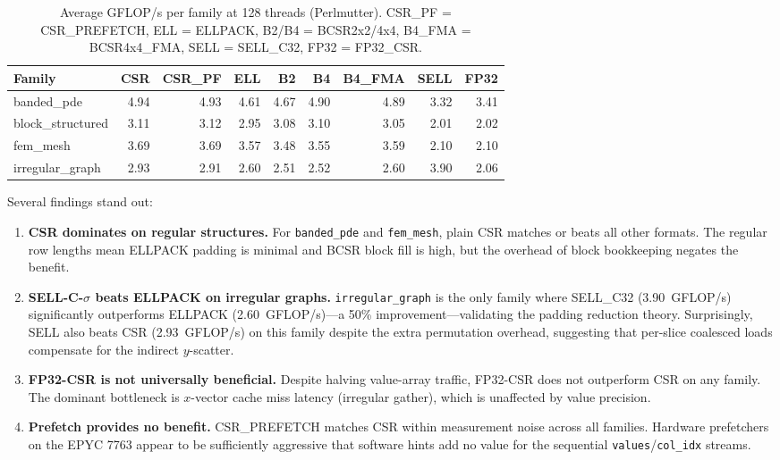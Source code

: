 \documentclass[11pt]{article}
\begin{document}
\begin{table}[h]
\centering
\small
\begin{tabular}{lrrrrrrrr}
\toprule
Family & CSR & CSR\_PF & ELL & B2 & B4 & B4\_FMA & SELL & FP32 \\
\midrule
banded\_pde      & 4.94 & 4.93 & 4.61 & 4.67 & 4.90 & 4.89 & 3.32 & 3.41 \\
block\_structured & 3.11 & 3.12 & 2.95 & 3.08 & 3.10 & 3.05 & 2.01 & 2.02 \\
fem\_mesh        & 3.69 & 3.69 & 3.57 & 3.48 & 3.55 & 3.59 & 2.10 & 2.10 \\
irregular\_graph  & 2.93 & 2.91 & 2.60 & 2.51 & 2.52 & 2.60 & 3.90 & 2.06 \\
\bottomrule
\end{tabular}
\caption{Average GFLOP/s per family at 128 threads (Perlmutter).
CSR\_PF = CSR\_PREFETCH, ELL = ELLPACK, B2/B4 = BCSR2x2/4x4,
B4\_FMA = BCSR4x4\_FMA, SELL = SELL\_C32, FP32 = FP32\_CSR.}
\label{tab:perfmax}
\end{table}

Several findings stand out:

\begin{enumerate}
  \item \textbf{CSR dominates on regular structures.}  For
  \texttt{banded\_pde} and \texttt{fem\_mesh}, plain CSR matches or beats
  all other formats.  The regular row lengths mean ELLPACK padding is
  minimal and BCSR block fill is high, but the overhead of block
  bookkeeping negates the benefit.

  \item \textbf{SELL-C-$\sigma$ beats ELLPACK on irregular graphs.}
  \texttt{irregular\_graph} is the only family where SELL\_C32
  (3.90~GFLOP/s) significantly outperforms ELLPACK (2.60~GFLOP/s)---a
  50\% improvement---validating the padding reduction theory.
  Surprisingly, SELL also beats CSR (2.93~GFLOP/s) on this family despite
  the extra permutation overhead, suggesting that per-slice coalesced loads
  compensate for the indirect $y$-scatter.

  \item \textbf{FP32-CSR is not universally beneficial.}  Despite halving
  value-array traffic, FP32-CSR does not outperform CSR on any family.
  The dominant bottleneck is $x$-vector cache miss latency (irregular
  gather), which is unaffected by value precision.

  \item \textbf{Prefetch provides no benefit.}  CSR\_PREFETCH matches CSR
  within measurement noise across all families.  Hardware prefetchers on
  the EPYC 7763 appear to be sufficiently aggressive that software hints
  add no value for the sequential \texttt{values}/\texttt{col\_idx} streams.
\end{enumerate}
\end{document}
